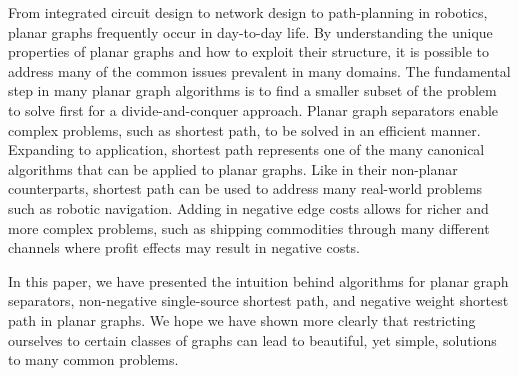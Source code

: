 \documentclass[11pt]{article}
\begin{document}
From integrated circuit design to network design to path-planning in robotics, planar graphs frequently occur in day-to-day life. By understanding the unique properties of planar graphs and how to exploit their structure, it is possible to address many of the common issues prevalent in many domains. The fundamental step in many planar graph algorithms is to find a smaller subset of the problem to solve first for a divide-and-conquer approach. Planar graph separators enable complex problems, such as shortest path, to be solved in an efficient manner. Expanding to application, shortest path represents one of the many canonical algorithms that can be applied to planar graphs. Like in their non-planar counterparts, shortest path can be used to address many real-world problems such as robotic navigation. Adding in negative edge costs allows for richer and more complex problems, such as shipping commodities through many different channels where profit effects may result in negative costs.

In this paper, we have presented the intuition behind algorithms for planar graph separators, non-negative single-source shortest path, and negative weight shortest path in planar graphs. We hope we have shown more clearly that restricting ourselves to certain classes of graphs can lead to beautiful, yet simple, solutions to many common problems.



\end{document}
